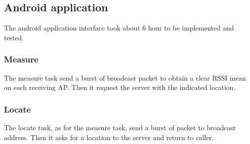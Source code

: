 \subsection{Android application}

The android application interface took about 6 hour to be implemented and tested.

\subsubsection{Measure}
    The measure task send a burst of broadcast packet to obtain a clear RSSI mean on each receiving AP. Then it request the server with the indicated location.
\subsubsection{Locate}
     The locate task, as for the measure task, send a burst of packet to broadcast address. Then it asks for a location to the server and return to caller. 

